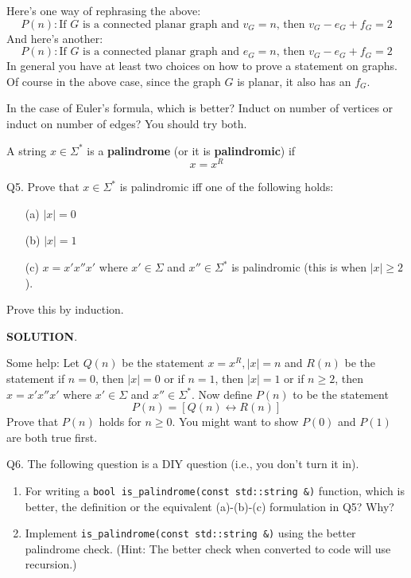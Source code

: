Here's one way of rephrasing the above:
\[
P(n): \text{If $G$ is a connected planar graph and $v_G = n$, then $v_G - e_G + f_G = 2$}
\]
And here's another:
\[
P(n): \text{If $G$ is a connected planar graph and $e_G = n$, then $v_G - e_G + f_G = 2$}
\]
In general you have at least two choices on how to prove a statement on graphs.
Of course in the above case, since the graph $G$ is planar, it also has an $f_G$.

In the case of Euler's formula, which is better?
Induct on number of vertices or induct on number of edges?
You should try both.




\newpage
A string $x \in \Sigma^*$ is a \textbf{palindrome} (or it is \textbf{palindromic}) if
\[
x = x^R
\]




\newpage
Q5.
Prove that $x \in \Sigma^*$ is palindromic iff one of the following holds:
\begin{enumerate}[nosep]
\item[(a)] $|x| = 0$
\item[(b)] $|x| = 1$
\item[(c)] $x = x' x'' x'$ where $x' \in \Sigma$ and $x'' \in \Sigma^*$ is palindromic (this is when $|x| \geq 2$).
\end{enumerate}
Prove this by induction.


\textbf{SOLUTION}.





\newpage
Some help:
Let $Q(n)$ be the statement $x = x^R, |x| = n$
and $R(n)$ be the statement
if $n = 0$, then $|x| = 0$ or
if $n = 1$, then $|x| = 1$ or
if $n \geq 2$, then $x = x'x''x'$ where $x' \in \Sigma$
and $x'' \in \Sigma^*$.
Now define $P(n)$ to be the statement
\[
P(n) = [Q(n) \longleftrightarrow R(n)]
\]
Prove that $P(n)$ holds for $n \geq 0$.
You might want to show $P(0)$ and $P(1)$ are both true first.

\newpage
Q6.
The following question is a DIY question (i.e., you don't turn it in).
\begin{enumerate}[nosep]
\item For writing a \verb!bool is_palindrome(const std::string &)! function,
which is better, the definition or the equivalent (a)-(b)-(c)
formulation in Q5?
Why?
\item Implement \verb!is_palindrome(const std::string &)! using the better
palindrome check.
(Hint: The better check when converted to code will use recursion.)
\end{enumerate}


